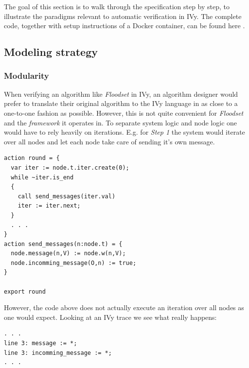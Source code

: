 \documentclass[fleqn]{article}
\begin{document}
The goal of this section is to walk through the specification step by step, to illustrate the paradigms relevant to automatic verification in IVy. The complete code, together with setup instructions of a Docker container, can be found here \cite{github}.

\subsection{Modeling strategy}

\subsubsection{Modularity}
When verifying an algorithm like \textit{Floodset} in IVy, an algorithm designer would prefer to translate their original algorithm to the IVy language in as close to a one-to-one fashion as possible. However, this is not quite convenient for \textit{Floodset} and the \textit{framework} it operates in.
To separate system logic and node logic one would have to rely heavily on iterations. E.g. for \textit{Step 1} the system would iterate over all nodes and let each node take care of sending it's own message.

\begin{mdframed}[backgroundcolor=light-gray, roundcorner=10pt,leftmargin=1, rightmargin=1, innerleftmargin=15, innertopmargin=15,innerbottommargin=15, outerlinewidth=1, linecolor=light-gray]
\begin{lstlisting}
action round = {
  var iter := node.t.iter.create(0);
  while ~iter.is_end
  {
    call send_messages(iter.val)
    iter := iter.next;
  }
  . . .
}
action send_messages(n:node.t) = {
  node.message(n,V) := node.w(n,V);
  node.incomming_message(O,n) := true;
}

export round
\end{lstlisting}
\end{mdframed}

\noindent However, the code above does not actually execute an iteration over all nodes as one would expect. Looking at an IVy trace we see what really happens:

\begin{mdframed}[backgroundcolor=light-gray, roundcorner=10pt,leftmargin=1, rightmargin=1, innerleftmargin=15, innertopmargin=15,innerbottommargin=15, outerlinewidth=1, linecolor=light-gray]
\begin{lstlisting}
. . .
line 3: message := *;
line 3: incomming_message := *;
. . .
\end{lstlisting}
\end{mdframed}
\end{document}

